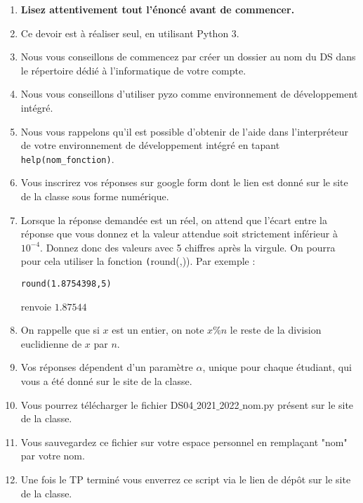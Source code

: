 
\begin{enumerate}
\item \textbf{Lisez attentivement  tout l'énoncé avant de commencer.}
\item Ce devoir est à réaliser seul, en utilisant Python 3.
\item Nous vous conseillons de commencez par créer un dossier au nom du DS dans le répertoire dédié à l'informatique de votre compte. 
\item Nous vous conseillons d'utiliser pyzo comme environnement de développement intégré.
\item Nous vous rappelons qu'il est possible d'obtenir de l'aide dans l'interpréteur de votre environnement de développement intégré en tapant \\
\texttt{help(nom\_fonction)}.
\item Vous inscrirez vos réponses sur google form dont le lien est donné sur le site de la classe sous forme numérique.
\item Lorsque la réponse demandée est un réel, on attend que l'écart entre la réponse que vous donnez et la valeur attendue soit strictement inférieur à $10^{-4}$. Donnez donc des valeurs avec 5 chiffres après la virgule. On pourra pour cela utiliser la fonction \texttt(round(,)). Par exemple : 
\begin{lstlisting}
round(1.8754398,5)
\end{lstlisting}

renvoie $1.87544$
\item On rappelle que si $x$ est un entier, on note $x \% n$ le reste de la division euclidienne de $x$ par $n$.
\item Vos réponses dépendent d'un paramètre $\alpha$, unique pour chaque étudiant, qui vous a été donné sur le site de la classe.
\item Vous pourrez télécharger le fichier DS04$\_$2021$\_$2022$\_$nom.py présent sur le site de la classe. 
\item Vous sauvegardez ce fichier sur votre espace personnel en remplaçant "nom" par votre nom.
\item Une fois le TP terminé vous enverrez ce script via le lien de dépôt sur le site de la classe.
\end{enumerate}



